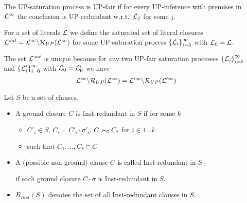    \begin{definition}[UP-Fairness]

            The UP-saturation process is {UP-fair} if for every UP-inference
            with premises in \( \mathcal{L}^\infty \) the conclusion is UP-redundant
            w.r.t.~\( \mathcal{L}_j \) for some \( j \).
   \end{definition}
   \begin{definition}

            For a set of literals \( \mathcal{L} \) we define
            the saturated set of literal closures
           \( \mathcal{L}^{sat} = \mathcal{L}^\infty\backslash\mathcal{R}_{UP}(\mathcal{L}^\infty) \)
            for some UP-saturation process
           \( {\{ \mathcal{L}_i \}}_{i=0}^\infty \)
            with \( \mathcal{L}_0 = \mathcal{L} \).
   \end{definition}


       \begin{lemma}
        The set \( \mathcal{L}^{sat} \) is unique because
        for any two UP-fair saturation processes
        \( {\{ \mathcal{L}_i \}}_{i=0}^\infty \) and
        \( {\{ \mathcal{L}'_i \}}_{i=0}^\infty \)
        with \( \mathcal{L}_0 = \mathcal{L}'_0 \) we have
        \begin{gather*}
            \mathcal{L}^\infty \backslash \mathcal{R}_{UP}(\mathcal{L}^\infty)
            =
            \mathcal{L}'^\infty \backslash \mathcal{R}_{UP}(\mathcal{L}'^\infty)
        \end{gather*}
       \end{lemma}

\begin{definition}\label{def:inst:redundant}

    Let \( S \) be a set of clauses.

   \begin{itemize}
       \item A ground closure \( C \) is Inst-redundant in \( S \)
        if for some \( k \)
       \begin{itemize}
           \item \( C'_i\in S \), \( C_i=C'_i\cdot\sigma'_i \), \( C\mathrel\succ_{\mathtt{C}} C_i \) \hfill for \( i\in 1\ldots k \)
           \item such that \( C_1,\ldots,C_k\models C \)
       \end{itemize}

       \item
        A (possible non-ground) clause \( C \) is called Inst-redundant in \( S \)

    if each ground closure \( C\cdot\sigma \) is Inst-redundant in \( S \).


   \item
   \( R_{Inst}(S) \) denotes the set of all Inst-redundant clauses in \( S \).


   \end{itemize}

\end{definition}


